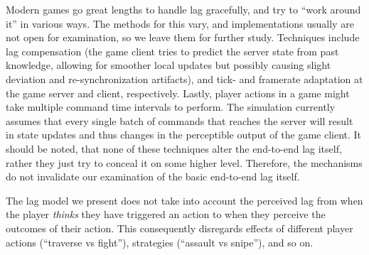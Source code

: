 Modern games go great lengths 
to handle lag gracefully, and try to ``work around it'' in various ways. 
The methods for this vary, and implementations usually are not open 
for examination, so we leave them for further study. 
Techniques include lag compensation (the game client 
tries to predict the server state from past knowledge, allowing for 
smoother local updates but possibly causing slight deviation and 
re-synchronization artifacts), and tick- and framerate adaptation 
at the game server and client, respectively.
Lastly, player actions in a game might take multiple command time 
intervals to perform. The simulation currently assumes that every 
single batch of commands that reaches the server will result in 
state updates and thus changes in the perceptible output of the game 
client. It should be noted, that none of these techniques alter the 
end-to-end lag itself, rather they just try to conceal it on some higher level. 
Therefore, the mechanisms do not invalidate our examination of the basic 
end-to-end lag itself.

The lag model 
we present does not take into account the perceived lag from when the 
player \textit{thinks} they have triggered an action to when they 
perceive the outcomes of their action. This consequently disregards 
effects of different player actions (``traverse vs fight''), strategies 
(``assault vs snipe''), and so on.















